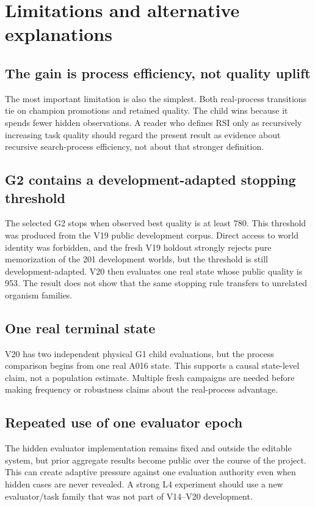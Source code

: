 \section{Limitations and alternative explanations}
\label{sec:limitations}

\subsection{The gain is process efficiency, not quality uplift}

The most important limitation is also the simplest. Both real-process transitions tie on champion promotions and retained quality. The child wins because it spends fewer hidden observations. A reader who defines RSI only as recursively increasing task quality should regard the present result as evidence about recursive search-process efficiency, not about that stronger definition.

\subsection{G2 contains a development-adapted stopping threshold}

The selected G2 stops when observed best quality is at least 780. This threshold was produced from the V19 public development corpus. Direct access to world identity was forbidden, and the fresh V19 holdout strongly rejects pure memorization of the 201 development worlds, but the threshold is still development-adapted. V20 then evaluates one real state whose public quality is 953. The result does not show that the same stopping rule transfers to unrelated organism families.

\subsection{One real terminal state}

V20 has two independent physical G1 child evaluations, but the process comparison begins from one real A016 state. This supports a causal state-level claim, not a population estimate. Multiple fresh campaigns are needed before making frequency or robustness claims about the real-process advantage.

\subsection{Repeated use of one evaluator epoch}

The hidden evaluator implementation remains fixed and outside the editable system, but prior aggregate results become public over the course of the project. This can create adaptive pressure against one evaluation authority even when hidden cases are never revealed. A strong L4 experiment should use a new evaluator/task family that was not part of V14--V20 development.

